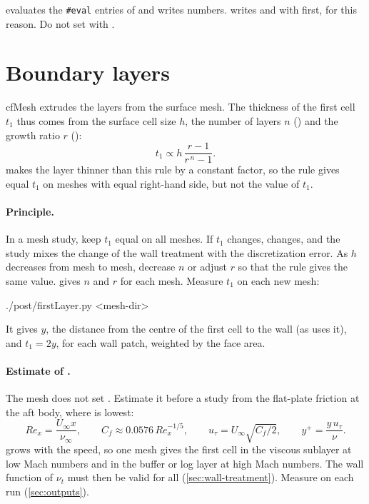 \begin{caution}
 evaluates the \texttt{\#eval} entries of  and
writes numbers.  writes  and  with 
first, for this reason. Do not set  with .
\end{caution}

\section{Boundary layers}\label{sec:layers}

cfMesh extrudes the layers from the surface mesh. The thickness of the first cell
$t_1$ thus comes from the surface cell size $h$, the number of layers $n$
() and the growth ratio $r$ ():
\[
  t_1 \propto h\,\frac{r - 1}{r^{\,n} - 1}.
\]
 makes the layer thinner than this rule by a constant factor, so the
rule gives equal $t_1$ on meshes with equal right-hand side, but not the value of $t_1$.

\paragraph{Principle.} In a mesh study, keep $t_1$ equal on all meshes. If $t_1$
changes, \yplus{} changes, and the study mixes the change of the wall treatment with
the discretization error. As $h$ decreases from mesh to mesh, decrease $n$ or adjust
$r$ so that the rule gives the same value.  gives $n$ and $r$ for each
mesh. Measure $t_1$ on each new mesh:
\begin{shell}
./post/firstLayer.py <mesh-dir>
\end{shell}
It gives $y$, the distance from the centre of the first cell to the wall (as
 uses it), and $t_1 = 2y$, for each wall patch, weighted by the face area.

\paragraph{Estimate of \yplus.} The mesh does not set \yplus. Estimate it before a
study from the flat-plate friction at the aft body, where \yplus{} is lowest:
\[
  Re_x = \frac{U_\infty x}{\nu_\infty},\qquad
  C_f \approx 0.0576\,Re_x^{-1/5},\qquad
  u_\tau = U_\infty\sqrt{C_f/2},\qquad
  y^+ = \frac{y\,u_\tau}{\nu}.
\]
\yplus{} grows with the speed, so one mesh gives the first cell in the viscous
sublayer at low Mach numbers and in the buffer or log layer at high Mach numbers. The
wall function of $\nu_t$ must then be valid for all \yplus{} (\cref{sec:wall-treatment}).
Measure \yplus{} on each run (\cref{sec:outputs}).

